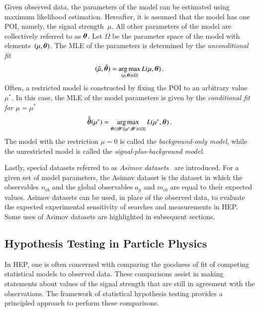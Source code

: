 Given observed data, the parameters of the model can be estimated using maximum
likelihood estimation. Hereafter, it is assumed that the model has one POI,
namely, the signal strength~$\mu$. All other parameters of the model are
collectively referred to as $\bm{\theta}$. Let $\Omega$ be the parameter
space of the model with elements~$(\mu, \bm{\theta})$. The MLE of the
parameters is determined by the \emph{unconditional fit}
\begin{align}
  (\hat{\mu}, \hat{\bm{\theta}}) = \operatorname*{arg\,max}_{(\mu, \bm{\theta}) \in \Omega} L(\mu, \bm{\theta}) \,\text{.}
  \label{eq:unconditional_fit}
\end{align}
Often, a restricted model is constructed by fixing the POI to an arbitrary value
$\mu^*$. In this case, the MLE of the model parameters is given by the
\emph{conditional fit for $\mu = \mu^*$}
\begin{align}
  \hat{\hat{\bm{\theta}}}(\mu^*) = \operatorname*{arg\,max}_{\bm{\theta} \in \{ \bm{\theta}^\prime \mid (\mu^*, \bm{\theta}^\prime) \in \Omega \} } L(\mu^*, \bm{\theta}) \,\text{.}
  \label{eq:conditional_fit}
\end{align}
The model with the restriction $\mu = 0$ is called the \emph{background-only
  model}, while the unrestricted model is called the
\emph{signal-plus-background model}.

Lastly, special datasets referred to as \emph{Asimov
  datasets}~\cite{Cowan:2010js} are introduced. For a given set of model
parameters, the Asimov dataset is the dataset in which the observables $n_{cb}$
and the global observables $a_p$ and $m_{cb}$ are equal to their expected
values. Asimov datasets can be used, in place of the observed data, to evaluate
the expected experimental sensitivity of searches and measurements in HEP. Some
uses of Asimov datasets are highlighted in subsequent sections.


\subsection{Hypothesis Testing in Particle Physics}%
\label{sec:hypotesting}

In HEP, one is often concerned with comparing the goodness of fit of competing
statistical models to observed data. These comparisons assist in making
statements about values of the signal strength that are still in agreement with
the observations. The framework of statistical hypothesis testing provides a
principled approach to perform these comparisons.

